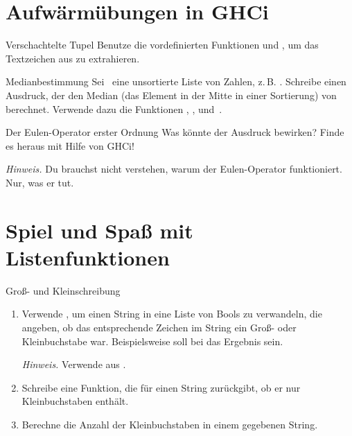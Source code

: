 \documentclass{uebblatt}
\begin{document}


\section{Aufwärmübungen in GHCi}

\begin{aufgabe}{Verschachtelte Tupel}
Benutze die vordefinierten Funktionen  und , um das Textzeichen aus  zu extrahieren.
\end{aufgabe}

\begin{aufgabe}{Medianbestimmung}
Sei~ eine unsortierte Liste von Zahlen, z.\,B. . Schreibe einen Ausdruck, der den Median (das Element in der Mitte in einer Sortierung) von~ berechnet. Verwende dazu die Funktionen , ,  und~\haskellinline{!!}.
\end{aufgabe}

\begin{aufgabe}{Der Eulen-Operator erster Ordnung}
Was könnte der Ausdruck  bewirken? Finde es heraus mit Hilfe von GHCi! \\
{\scriptsize \emph{Hinweis.} Du brauchst nicht verstehen, warum der Eulen-Operator funktioniert. Nur, was er tut. \par}
\end{aufgabe}


\section{Spiel und Spaß mit Listenfunktionen}

\begin{aufgabe}{Groß- und Kleinschreibung}
  \begin{enumerate}
    \item Verwende , um einen String in eine Liste von Bools zu verwandeln, die angeben, ob das entsprechende Zeichen im String ein Groß- oder Kleinbuchstabe war.
    Beispielsweise soll bei  das Ergebnis  sein. \\
    {\scriptsize \emph{Hinweis.} Verwende  aus .\par}
    \item Schreibe eine Funktion, die für einen String zurückgibt, ob er nur Kleinbuchstaben enthält.
    \item Berechne die Anzahl der Kleinbuchstaben in einem gegebenen String.
  \end{enumerate}
\end{aufgabe}
\end{document}
